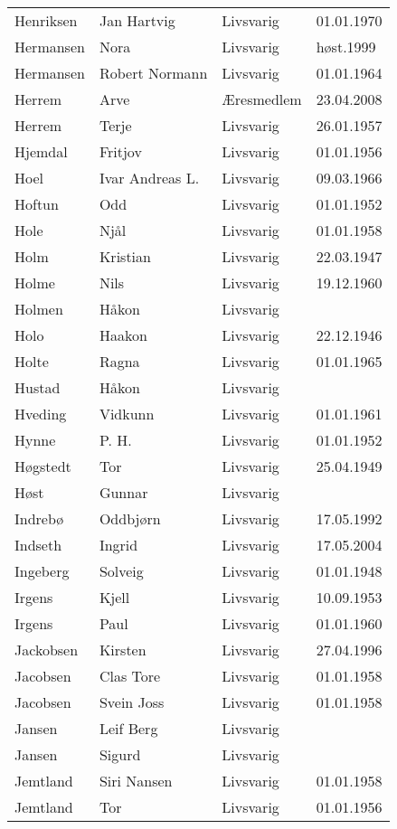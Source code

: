\documentclass[fsbok.tex]{subfiles}
\begin{document}
\begin{longtable}{llll}
Henriksen	&	Jan Hartvig	&	Livsvarig 	&	01.01.1970	\\
Hermansen	&	Nora	&	Livsvarig	&	høst.1999	\\
Hermansen	&	Robert Normann	&	Livsvarig 	&	01.01.1964	\\
Herrem	&	Arve	&	Æresmedlem	&	23.04.2008	\\
Herrem	&	Terje	&	Livsvarig 	&	26.01.1957	\\
Hjemdal	&	Fritjov	&	Livsvarig 	&	01.01.1956	\\
Hoel	&	Ivar Andreas L.	&	Livsvarig 	&	09.03.1966	\\
Hoftun	&	Odd	&	Livsvarig 	&	01.01.1952	\\
Hole	&	Njål	&	Livsvarig 	&	01.01.1958	\\
Holm	&	Kristian	&	Livsvarig 	&	22.03.1947	\\
Holme	&	Nils	&	Livsvarig 	&	19.12.1960	\\
Holmen	&	Håkon	&	Livsvarig 	&		\\
Holo	&	Haakon	&	Livsvarig 	&	22.12.1946	\\
Holte	&	Ragna	&	Livsvarig 	&	01.01.1965	\\
Hustad	&	Håkon	&	Livsvarig 	&		\\
Hveding	&	Vidkunn	&	Livsvarig 	&	01.01.1961	\\
Hynne	&	P. H. 	&	Livsvarig 	&	01.01.1952	\\
Høgstedt	&	Tor	&	Livsvarig 	&	25.04.1949	\\
Høst	&	Gunnar	&	Livsvarig 	&		\\
Indrebø	&	Oddbjørn	&	Livsvarig 	&	17.05.1992	\\
Indseth 	&	Ingrid	&	Livsvarig	&	17.05.2004	\\
Ingeberg	&	Solveig	&	Livsvarig 	&	01.01.1948	\\
Irgens	&	Kjell	&	Livsvarig 	&	10.09.1953	\\
Irgens	&	Paul	&	Livsvarig 	&	01.01.1960	\\
Jackobsen 	&	Kirsten	&	Livsvarig	&	27.04.1996	\\
Jacobsen	&	Clas Tore	&	Livsvarig 	&	01.01.1958	\\
Jacobsen	&	Svein Joss	&	Livsvarig 	&	01.01.1958	\\
Jansen	&	Leif Berg	&	Livsvarig 	&		\\
Jansen	&	Sigurd	&	Livsvarig 	&		\\
Jemtland	&	Siri Nansen	&	Livsvarig 	&	01.01.1958	\\
Jemtland	&	Tor	&	Livsvarig 	&	01.01.1956	\\

\end{longtable}
\end{document}
